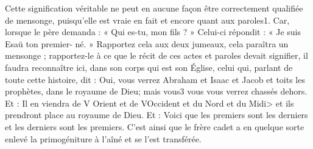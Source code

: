  Cette signification véritable ne peut en aucune façon être correctement qualifiée de mensonge, puisqu’elle est vraie en fait et encore quant aux paroles1. Car, lorsque le père demanda : « Qui es-tu, mon fils ? » Celui-ci répondit : « Je suis Esaü ton premier- né. » Rapportez cela aux deux jumeaux, cela paraîtra un mensonge ; rapportez-le à ce que le récit de ces actes et paroles devait signifier, il faudra reconnaître ici, dans son corps qui est son Église, celui qui, parlant de toute cette histoire, dit : Oui, vous verrez Abraham et Isaac et Jacob et toits les prophètes, dans le royaume de Dieu; mais vous3 vous vous verrez chassés dehors. Et : Il en viendra de V Orient et de VOccident et du Nord et du Midi> et ils prendront place au royaume de Dieu. Et : Voici que les premiers sont les derniers et les derniers sont les premiers. C’est ainsi que le frère cadet a en quelque sorte enlevé la primogéniture à l’aîné et se l’est transférée.